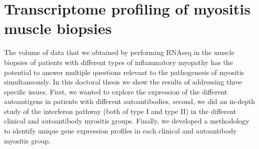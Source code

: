 \begin{table}
\caption{Proposal of myositis classification based on myositis-specific autoantibodies}
\label{tab:criteria}
\end{table}

\section{Transcriptome profiling of myositis muscle biopsies}

The volume of data that we obtained by performing RNAseq in the muscle biopsies of patients with different types of inflammatory myopathy has the potential to answer multiple questions relevant to the pathogenesis of myositis simultaneously. In this doctoral thesis we show the results of addressing three specific issues. First, we wanted to explore the expression of the different autoantigens in patients with different autoantibodies, second, we did an in-depth study of the interferon pathway (both of type I and type II) in the different clinical and autoantibody myositis groups. Finally, we developed a methodology to identify unique gene expression profiles in each clinical and autoantibody myositis group.

